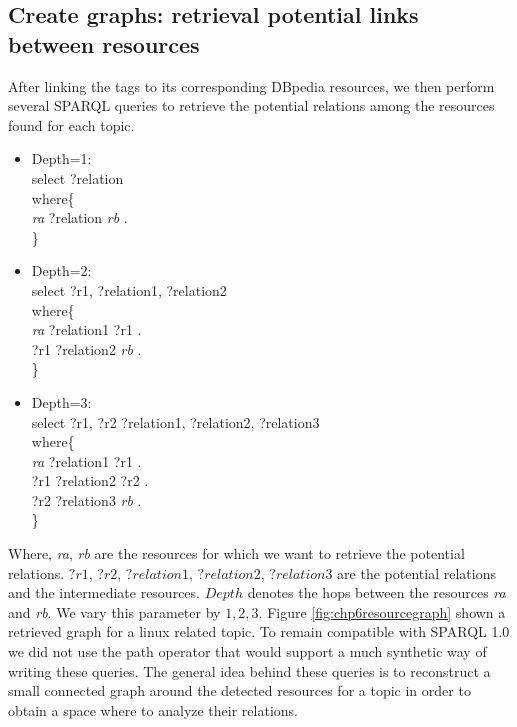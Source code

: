 \subsection{Create graphs: retrieval potential links between resources}
After linking the tags to its corresponding DBpedia resources, we then perform several SPARQL queries to retrieve the potential relations among the resources found for each topic. 
\begin{itemize}
\item {Depth=1:} \\
select  ?relation \\
where\{ \\
\textit{ra} ?relation \textit{rb} . \\
\} 
\item{ Depth=2:} \\
select  ?r1, ?relation1, ?relation2 \\
where\{ \\
\textit{ra} ?relation1 ?r1 . \\
?r1 ?relation2 \textit{rb} .\\
\} 
\item{ Depth=3:} \\
select  ?r1, ?r2 ?relation1, ?relation2, ?relation3 \\
where\{ \\ 
 \textit{ra} ?relation1 ?r1 . \\
 ?r1 ?relation2 ?r2 .\\
 ?r2 ?relation3 \textit{rb} .\\
\} 
\end{itemize}

Where, \textit{ra}, \textit{rb} are the resources for which we want to retrieve the potential relations. $?r1$, $?r2$, $?relation1$, $?relation2$, $?relation3$ are the potential relations and the intermediate resources. $Depth$ denotes the hops between the resources \textit{ra} and \textit{rb}. We vary this parameter by $1,2,3$. Figure \ref{fig:chp6resourcegraph} shown a retrieved graph for a linux related topic.
To remain compatible with SPARQL 1.0 we did not use the path operator that would support a much synthetic way of writing these queries. The general idea behind these queries is to reconstruct a small connected graph around the detected resources for a topic in order to obtain a space where to analyze their relations.

